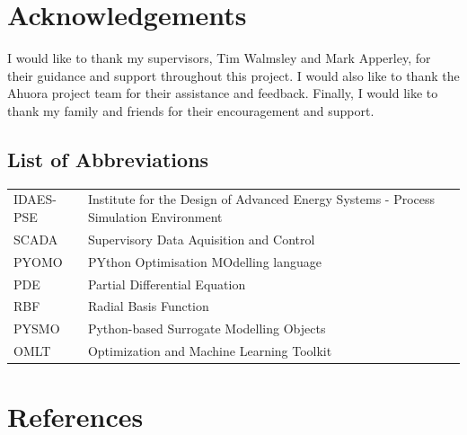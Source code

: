 \documentclass[12pt]{report}
\begin{document}

\chapter*{Acknowledgements}

I would like to thank my supervisors, Tim Walmsley and Mark Apperley, for their guidance and support throughout this project. I would also like to thank the Ahuora project team for their assistance and feedback. Finally, I would like to thank my family and friends for their encouragement and support.

\tableofcontents
\listoffigures
\listoftables

\section*{List of Abbreviations}

\begin{tabular}{lL{13cm}}
    IDAES-PSE & Institute for the Design of Advanced Energy Systems - Process Simulation Environment \\
    SCADA & Supervisory Data Aquisition and Control \\
    PYOMO & PYthon Optimisation MOdelling language \\
    PDE & Partial Differential Equation \\
    RBF & Radial Basis Function \\
    PYSMO & Python-based Surrogate Modelling Objects \\
    OMLT & Optimization and Machine Learning Toolkit \\
\end{tabular}

\newpage
{}
















\chapter*{References}
\end{document}
